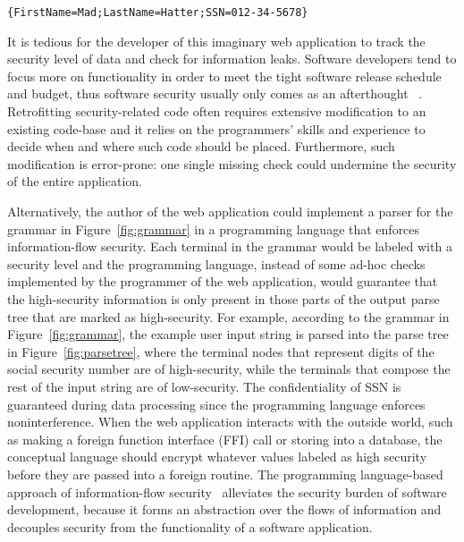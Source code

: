\begin{lstlisting}[numbers=none,xleftmargin=0.1\textwidth]
{FirstName=Mad;LastName=Hatter;SSN=012-34-5678}
\end{lstlisting}

It is tedious for the developer of this imaginary web application
to track the security level of data and check for information leaks.
Software developers tend to focus more on functionality
in order to meet the tight software release schedule and budget,
thus software security usually only comes as an afterthought
~\parencite{assal2018security,sharma2017aspects,steward2012software}.
Retrofitting security-related code often requires extensive modification to
an existing code-base and it relies on the programmers' skills
and experience to decide when and where such code should be placed.
Furthermore, such modification is error-prone: one single missing
check could undermine the security of the entire application.

Alternatively, the author of the web application could implement
a parser for the grammar in Figure~\ref{fig:grammar} in
a programming language that enforces information-flow security.
Each terminal in the grammar would be labeled with a security level and
the programming language, instead of some ad-hoc checks implemented by
the programmer of the web application, would guarantee that
the high-security information is only present in those parts of
the output parse tree that are marked as high-security.
For example, according to the grammar in Figure~\ref{fig:grammar},
the example user input string is parsed into the parse tree in
Figure~\ref{fig:parsetree}, where the terminal nodes that represent digits of
the social security number are of {\color{red} high-security},
while the terminals that compose the rest of the input string are of
{\color{green} low-security}.  The confidentiality of SSN is guaranteed
during data processing since the programming language enforces
noninterference. When the web application interacts with the outside
world, such as making a foreign function interface (FFI) call
or storing into a database, the conceptual language should encrypt
whatever values labeled as high security before they are passed into a
foreign routine. The programming language-based approach of
information-flow security~\parencite{sabelfeld2003language}
alleviates the security burden of software development,
because it forms an abstraction over the flows of information and
decouples security from the functionality of a software application.

